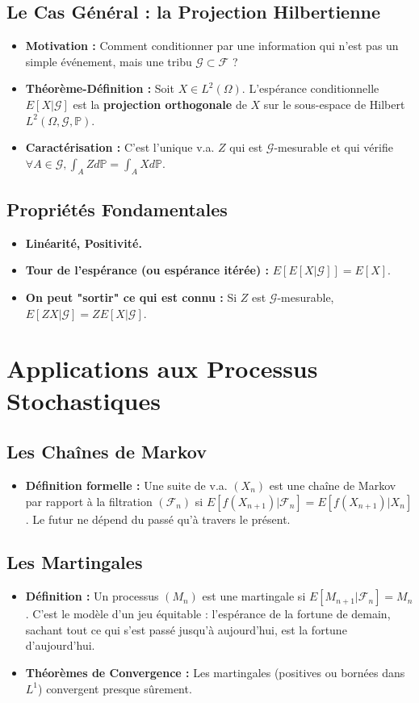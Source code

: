 \documentclass[12pt, a4paper, parskip=full]{report}
\theoremstyle{agregstyle}
\begin{document}
\subsection{Le Cas Général : la Projection Hilbertienne}
\begin{itemize}
    \item \textbf{Motivation :} Comment conditionner par une information qui n'est pas un simple événement, mais une tribu $\mathcal{G} \subset \mathcal{F}$ ?
    \item \textbf{Théorème-Définition :} Soit $X \in L^2(\Omega)$. L'espérance conditionnelle $E[X|\mathcal{G}]$ est la \textbf{projection orthogonale} de $X$ sur le sous-espace de Hilbert $L^2(\Omega, \mathcal{G}, \mathbb{P})$.
    \item \textbf{Caractérisation :} C'est l'unique v.a. $Z$ qui est $\mathcal{G}$-mesurable et qui vérifie $\forall A \in \mathcal{G}, \int_A Z d\mathbb{P} = \int_A X d\mathbb{P}$.
\end{itemize}
\subsection{Propriétés Fondamentales}
\begin{itemize}
    \item \textbf{Linéarité, Positivité.}
    \item \textbf{Tour de l'espérance (ou espérance itérée) :} $E[E[X|\mathcal{G}]] = E[X]$.
    \item \textbf{On peut "sortir" ce qui est connu :} Si $Z$ est $\mathcal{G}$-mesurable, $E[ZX|\mathcal{G}] = Z E[X|\mathcal{G}]$.
\end{itemize}

\section{Applications aux Processus Stochastiques}
\subsection{Les Chaînes de Markov}
\begin{itemize}
    \item \textbf{Définition formelle :} Une suite de v.a. $(X_n)$ est une chaîne de Markov par rapport à la filtration $(\mathcal{F}_n)$ si $E[f(X_{n+1})|\mathcal{F}_n] = E[f(X_{n+1})|X_n]$. Le futur ne dépend du passé qu'à travers le présent.
\end{itemize}
\subsection{Les Martingales}
\begin{itemize}
    \item \textbf{Définition :} Un processus $(M_n)$ est une martingale si $E[M_{n+1}|\mathcal{F}_n]=M_n$. C'est le modèle d'un jeu équitable : l'espérance de la fortune de demain, sachant tout ce qui s'est passé jusqu'à aujourd'hui, est la fortune d'aujourd'hui.
    \item \textbf{Théorèmes de Convergence :} Les martingales (positives ou bornées dans $L^1$) convergent presque sûrement.
\end{itemize}
\end{document}
